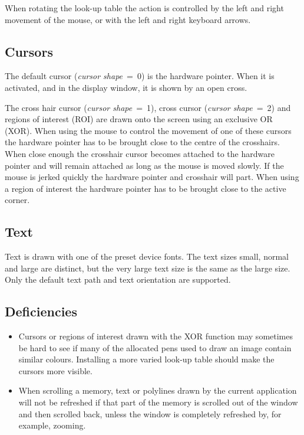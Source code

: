 \documentclass[11pt,nolof]{starlink}
\begin{document}
When rotating the look-up table the action is controlled by the left
and right movement of the mouse, or with the left and right keyboard
arrows.

\subsection{Cursors}

The default cursor (\textit{cursor shape}~=~0) is the hardware pointer. When
it is activated, and in the display window, it is shown by an open cross.

The cross hair cursor (\textit{cursor shape}~=~1), cross cursor (\textit{cursor
shape}~=~2) and regions of interest (ROI) are drawn onto the screen using
an exclusive OR (XOR).
When using the mouse to control the movement of one of these cursors the
hardware pointer has to be brought close to the centre of the crosshairs.
When close enough the crosshair cursor becomes attached to the hardware
pointer and will remain attached as long as the mouse is moved slowly.
If the mouse is jerked quickly the hardware pointer and crosshair
will part. When using a region of interest the hardware pointer has
to be brought close to the active corner.

\subsection{Text}

Text is drawn with one of the preset device fonts. The text sizes small,
normal and large are distinct, but the very large text size is the same
as the large size. Only the default text path and text orientation are
supported.

\subsection{Deficiencies}

\begin{itemize}
\item
Cursors or regions of interest drawn with the XOR function may sometimes
be hard to see if many of the allocated pens used to draw an image contain
similar colours. Installing a more varied look-up table should make the
cursors more visible.

\item
When scrolling a memory, text or polylines drawn by the current application
will not be refreshed if that part of the memory is scrolled out of the
window and then scrolled back, unless the window is completely refreshed by,
for example, zooming.
\end{itemize}
\end{document}
